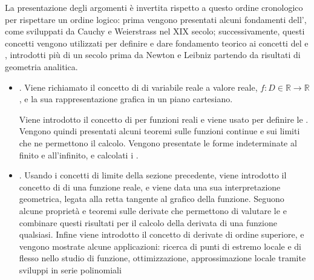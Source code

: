 \documentclass[letterpaper,10pt,english]{jupyterBook}
\begin{document}
\sphinxAtStartPar
La presentazione degli argomenti è invertita rispetto a questo ordine cronologico per rispettare un ordine logico: prima vengono presentati alcuni fondamenti dell’, come sviluppati da Cauchy e Weierstrass nel XIX secolo; successivamente, questi concetti vengono utilizzati per definire e dare fondamento teorico ai concetti del  e , introdotti più di un secolo prima da Newton e Leibniz partendo da risultati di geometria analitica.



\sphinxAtStartPar
{}
\begin{itemize}
\item {} 
\sphinxAtStartPar
{\hyperref[\detokenize{ch/infinitesimal_calculus/analysis:infinitesimal-calculus-analysis}]{}}. Viene richiamato il concetto di  di variabile reale a valore reale, \(f: D \in \mathbb{R} \rightarrow \mathbb{R}\), e la sua rappresentazione grafica in un piano cartesiano.

\sphinxAtStartPar
Viene introdotto il concetto di  per funzioni reali e viene usato per definire le . Vengono quindi presentati alcuni teoremi sulle funzioni continue e sui limiti che ne permettono il calcolo. Vengono presentate le forme indeterminate al finito e all’infinito, e calcolati i .

\item {} 
\sphinxAtStartPar
{\hyperref[\detokenize{ch/infinitesimal_calculus/derivatives:infinitesimal-calculus-derivatives}]{}}. Usando i concetti di limite della sezione precedente, viene introdotto il concetto di  di una funzione reale, e viene data una sua interpretazione geometrica, legata alla retta tangente al grafico della funzione. Seguono alcune proprietà e teoremi sulle derivate che permettono di valutare le  e combinare questi risultati per il calcolo della derivata di una funzione qualsiasi. Infine viene introdotto il concetto di derivate di ordine superiore, e vengono mostrate alcune applicazioni: ricerca di punti di estremo locale e di flesso nello studio di funzione, ottimizzazione, approssimazione locale tramite sviluppi in serie polinomiali


\end{itemize}
\end{document}
